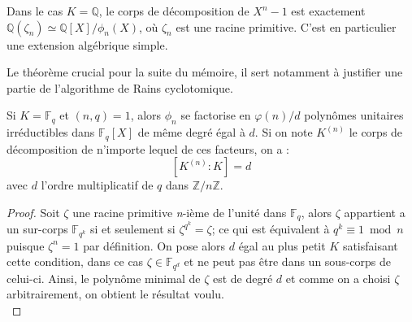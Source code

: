 \documentclass[a4paper]{article} %
\numberwithin{section}{part}
\numberwithin{equation}{section}
\newcommand\nroot[1]{\textit{#1}-ième}
\newcommand\zmodn[1]{\mathbb{Z}/#1\mathbb{Z}}
\newcommand\GF[1]{\mathbb{F}_{#1}}
\newcommand\QQ{\mathbb{Q}}
\begin{document}
\begin{rem}
Dans le cas $K = \QQ$, le corps de décomposition de $X^n - 1$ est exactement 
$\QQ(\zeta_n) \simeq \QQ[X]/\phi_n(X)$, où $\zeta_n$ est une racine primitive. 
C'est en particulier une extension algébrique simple.
\end{rem}

Le théorème crucial pour la suite du mémoire, il sert notamment à justifier une
partie de l'algorithme de Rains cyclotomique.

\begin{thm}
\label{th:polycycldecomp}
Si $K = \GF{q}$ et $(n,q) = 1$, alors $\phi_n$ se factorise en $\varphi(n)/d$ 
polynômes unitaires irréductibles dans $\GF{q}[X]$ de même degré égal à $d$. Si
on note $K^{(n)}$ le corps de décomposition de n'importe lequel de ces facteurs,
on a :
\[[K^{(n)}:K] = d\]
avec $d$ l'ordre multiplicatif de $q$ dans $\zmodn{n}$.
\end{thm}
\begin{proof}
Soit $\zeta$ une racine primitive \nroot{n} de l'unité dans $\GF{q}$, alors 
$\zeta$ appartient a un sur-corps $\GF{q^k}$ si et seulement si $\zeta^{q^k} = 
\zeta$; ce qui est équivalent à $q^k \equiv 1 \bmod n$ puisque $\zeta^n = 1$ par
définition. On pose alors $d$ égal au plus petit $K$ satisfaisant cette 
condition, dans ce cas $\zeta\in\GF{q^d}$ et ne peut pas être dans un sous-corps
de celui-ci. Ainsi, le polynôme minimal de $\zeta$ est de degré $d$ et comme on 
a choisi $\zeta$ arbitrairement, on obtient le résultat voulu.\\
\end{proof}
\end{document}
